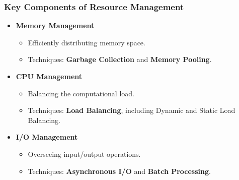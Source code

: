 \documentclass{beamer}
\begin{document}
\begin{frame}[fragile]
    \frametitle{Key Components of Resource Management}
    \begin{itemize}
        \item \textbf{Memory Management}
        \begin{itemize}
            \item Efficiently distributing memory space.
            \item Techniques: \textbf{Garbage Collection} and \textbf{Memory Pooling}.
        \end{itemize}
        
        \item \textbf{CPU Management}
        \begin{itemize}
            \item Balancing the computational load.
            \item Techniques: \textbf{Load Balancing}, including Dynamic and Static Load Balancing.
        \end{itemize}
        
        \item \textbf{I/O Management}
        \begin{itemize}
            \item Overseeing input/output operations.
            \item Techniques: \textbf{Asynchronous I/O} and \textbf{Batch Processing}.
        \end{itemize}
    \end{itemize}
\end{frame}
\end{document}
